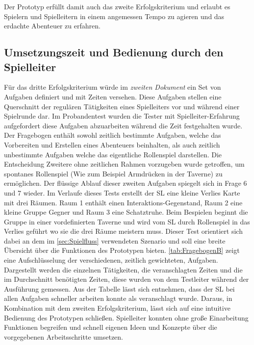 Der Prototyp erfüllt damit auch das zweite Erfolgskriterium und erlaubt es Spielern und Spielleitern in einem angemessen Tempo zu agieren und das erdachte Abenteuer zu erfahren.




\subsection{Umsetzungszeit und Bedienung durch den Spielleiter}
\label{sec:UmsetzungszeitUndBedienungDurchDenSpielleiter}
Für das dritte Erfolgskriterium würde im \emph{zweiten Dokument} ein Set von Aufgaben definiert und mit Zeiten versehen. Diese Aufgaben stellen eine Querschnitt der regulären Tätigkeiten eines Spielleiters vor und während einer Spielrunde dar. Im Probandentest wurden die Tester mit Spielleiter-Erfahrung aufgefordert diese Aufgaben abzuarbeiten während die Zeit festgehalten wurde. Der Fragebogen enthält sowohl zeitlich bestimmte Aufgaben, welche das Vorbereiten und Erstellen eines Abenteuers beinhalten, als auch zeitlich unbestimmte Aufgaben welche das eigentliche Rollenspiel darstellen. Die Entscheidung Zweitere ohne zeitlichen Rahmen vorzugeben wurde getroffen, um spontanes Rollenspiel (Wie zum Beispiel Armdrücken in der Taverne) zu ermöglichen. Der flüssige Ablauf dieser zweiten Aufgaben spiegelt sich in Frage 6 und 7 wieder. Im Verlaufe dieses Tests erstellt der SL eine kleine Verlies Karte mit drei Räumen. Raum 1 enthält einen Interaktions-Gegenstand, Raum 2 eine kleine Gruppe Gegner und Raum 3 eine Schatztruhe.\newline
Beim Bespielen beginnt die Gruppe in einer vordefinierten Taverne und wird vom SL durch Rollenspiel in das Verlies geführt wo sie die drei Räume meistern muss. Dieser Test orientiert sich dabei an dem im \ref{sec:Spielfluss} verwendeten Szenario und soll eine breite Übersicht über die Funktionen des Prototypen bieten.\newline
\ref{tab:FragebogenB} zeigt eine Aufschlüsselung der verschiedenen, zeitlich gewichteten, Aufgaben. Dargestellt werden die einzelnen Tätigkeiten, die veranschlagten Zeiten und die im Durchschnitt benötigten Zeiten, diese wurden von dem Testleiter während der Ausführung gemessen. Aus der Tabelle lässt sich entnehmen, dass der SL bei allen Aufgaben schneller arbeiten konnte als veranschlagt wurde. Daraus, in Kombination mit dem zweiten Erfolgskriterium, lässt sich auf eine intuitive Bedienung des Prototypen schließen. Spielleiter konnten ohne große Einarbeitung Funktionen begreifen und schnell eigenen Ideen und Konzepte über die vorgegebenen Arbeitsschritte umsetzen. 
